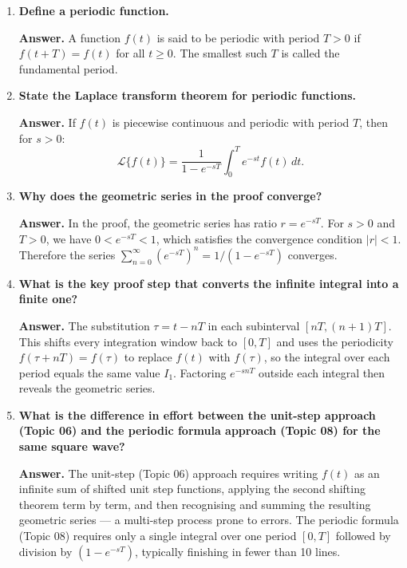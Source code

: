 \documentclass[12pt,a4paper]{article}
\begin{document}
\begin{enumerate}[label=\textbf{Q\arabic*.}, leftmargin=*, wide]

\item \textbf{Define a periodic function.}

\textbf{Answer.} A function $f(t)$ is said to be periodic with period $T > 0$
if $f(t + T) = f(t)$ for all $t \ge 0$. The smallest such $T$ is called the
fundamental period.

\item \textbf{State the Laplace transform theorem for periodic functions.}

\textbf{Answer.} If $f(t)$ is piecewise continuous and periodic with period
$T$, then for $s > 0$:
\[
  \mathcal{L}\{f(t)\}
  = \frac{1}{1 - e^{-sT}} \int_0^T e^{-st} f(t)\,dt.
\]

\item \textbf{Why does the geometric series in the proof converge?}

\textbf{Answer.} In the proof, the geometric series has ratio $r = e^{-sT}$.
For $s > 0$ and $T > 0$, we have $0 < e^{-sT} < 1$, which satisfies the
convergence condition $|r| < 1$. Therefore the series
$\sum_{n=0}^{\infty}(e^{-sT})^n = 1/(1-e^{-sT})$ converges.

\item \textbf{What is the key proof step that converts the infinite integral
into a finite one?}

\textbf{Answer.} The substitution $\tau = t - nT$ in each subinterval
$[nT, (n+1)T]$. This shifts every integration window back to $[0,T]$ and
uses the periodicity $f(\tau + nT) = f(\tau)$ to replace $f(t)$ with $f(\tau)$,
so the integral over each period equals the same value $I_1$. Factoring
$e^{-snT}$ outside each integral then reveals the geometric series.

\item \textbf{What is the difference in effort between the unit-step approach
(Topic 06) and the periodic formula approach (Topic 08) for the same square
wave?}

\textbf{Answer.} The unit-step (Topic 06) approach requires writing $f(t)$ as
an infinite sum of shifted unit step functions, applying the second shifting
theorem term by term, and then recognising and summing the resulting geometric
series --- a multi-step process prone to errors. The periodic formula (Topic 08)
requires only a single integral over one period $[0,T]$ followed by division by
$(1 - e^{-sT})$, typically finishing in fewer than 10 lines.


\end{enumerate}
\end{document}
